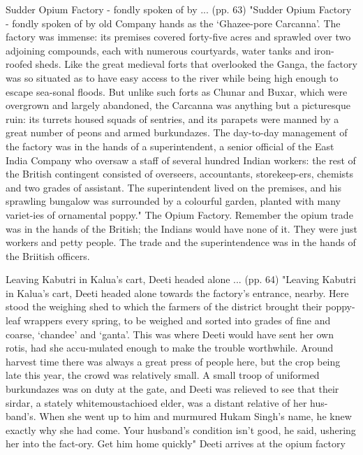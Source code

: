Sudder Opium Factory - fondly spoken of by ... (pp. 63)
"Sudder Opium Factory - fondly spoken of by old Company hands as the ‘Ghazee-pore Carcanna’. The factory was immense: its premises covered forty-five acres and sprawled over two adjoining compounds, each with numerous courtyards, water tanks and iron-roofed sheds. Like the great medieval forts that overlooked the Ganga, the factory was so situated as to have easy access to the river while being high enough to escape sea-sonal floods. But unlike such forts as Chunar and Buxar, which were overgrown and largely abandoned, the Carcanna was anything but a picturesque ruin: its turrets housed squads of sentries, and its parapets were manned by a great number of peons and armed burkundazes. The day-to-day management of the factory was in the hands of a superintendent, a senior official of the East India Company who oversaw a staff of several hundred Indian workers: the rest of the British contingent consisted of overseers, accountants, storekeep-ers, chemists and two grades of assistant. The superintendent lived on the premises, and his sprawling bungalow was surrounded by a colourful garden, planted with many variet-ies of ornamental poppy."
The Opium Factory. Remember the opium trade was in the hands of the British; the Indians would have none of it. They were just workers and petty people. The trade and the superintendence was in the hands of the Briitish officers.

Leaving Kabutri in Kalua’s cart, Deeti headed alone ... (pp. 64)
"Leaving Kabutri in Kalua’s cart, Deeti headed alone towards the factory’s entrance, nearby. Here stood the weighing shed to which the farmers of the district brought their poppy-leaf wrappers every spring, to be weighed and sorted into grades of fine and coarse, ‘chandee’ and ‘ganta’. This was where Deeti would have sent her own rotis, had she accu-mulated enough to make the trouble worthwhile. Around harvest time there was always a great press of people here, but the crop being late this year, the crowd was relatively small. A small troop of uniformed burkundazes was on duty at the gate, and Deeti was relieved to see that their sirdar, a stately whitemoustachioed elder, was a distant relative of her hus-band’s. When she went up to him and murmured Hukam Singh’s name, he knew exactly why she had come. Your husband’s condition isn’t good, he said, ushering her into the fact-ory. Get him home quickly"
Deeti arrives at the opium factory

